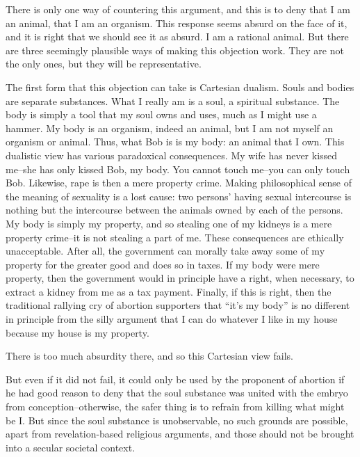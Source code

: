 There is only one way of countering this argument, and this is to 
deny that I am an animal, that I am an organism.  This response seems 
absurd on the face of it, and it is right that we should see it as absurd.  I 
am a rational animal.  But there are three seemingly plausible ways of 
making this objection work.  They are not the only ones, but they will be 
representative. 

The  first  form  that  this  objection  can  take  is  Cartesian  dualism.  
Souls and bodies are separate substances.  What I really am is a soul, a 
spiritual  substance.  The body is simply a tool that my soul owns and 
uses, much as I might use a hammer.  My body is an organism, indeed an 
animal, but I am not myself an organism or animal.  Thus, what Bob is is 
my  body:  an  animal  that  I  own.    This  dualistic  view  has  various 
paradoxical consequences.  My wife has never kissed me–she has only 
kissed Bob, my body.  You cannot touch me–you can only touch Bob.  
Likewise, rape is then a mere property crime. Making philosophical sense 
of the meaning of sexuality is a lost cause: two persons’ having sexual 
intercourse is nothing but the intercourse between the animals owned by 
each of the persons.  My body is simply my property, and so stealing one 
of my kidneys is a mere property crime–it is not stealing a part of me.  
These consequences are ethically unacceptable.  After all, the 
government can morally take away some of my property for the greater 
good  and  does  so  in  taxes.    If  my  body  were  mere  property,  then  the 
government would in principle have a right, when necessary, to extract a 
kidney  from  me  as  a  tax  payment.    Finally,  if  this  is  right,  then  the 
traditional rallying cry of abortion supporters that “it’s my body” is no 
different in principle from the silly argument that I can do whatever I like 
in my house because my house is my property. 

There is too much absurdity there, and so this Cartesian view fails.  

But  even  if  it  did  not  fail,  it  could  only  be  used  by  the  proponent  of 
abortion if he had good reason to deny that the soul substance was united 
with the embryo from conception–otherwise, the safer thing is to refrain 
from killing what might be I.  But since the soul substance is 
unobservable, no such grounds are possible, apart from revelation-based 
religious  arguments,  and  those  should  not  be  brought  into  a  secular 
societal context. 

